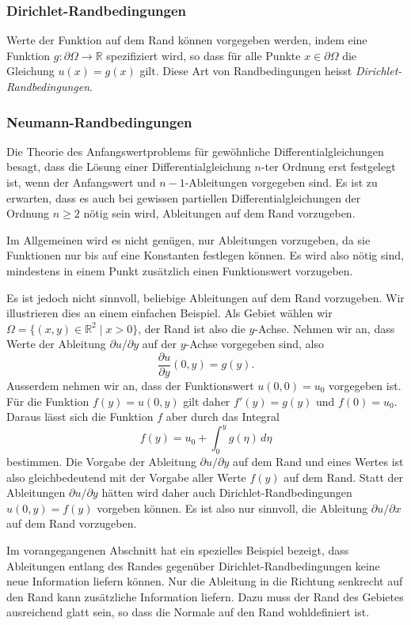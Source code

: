 \subsubsection{Dirichlet-Randbedingungen}
Werte der Funktion auf dem Rand können vorgegeben werden, indem eine
Funktion $g\colon \partial\Omega\to\mathbb R$ spezifiziert wird, so
dass für alle Punkte $x\in\partial\Omega$ die Gleichung
$
u(x) = g(x) 
$
gilt.
Diese Art von Randbedingungen heisst {\em Dirichlet-Randbedingungen}.

\subsubsection{Neumann-Randbedingungen}
Die Theorie des Anfangswertproblems für gewöhnliche Differentialgleichungen
besagt, dass die Lösung einer Differentialgleichung $n$-ter Ordnung erst
festgelegt ist, wenn der Anfangswert und $n-1$-Ableitungen vorgegeben sind.
Es ist zu erwarten, dass es auch bei gewissen partiellen
Differentialgleichungen der Ordnung $n\ge 2$ nötig sein wird, 
Ableitungen auf dem Rand vorzugeben.

Im Allgemeinen wird es nicht genügen, nur Ableitungen vorzugeben,
da sie Funktionen nur bis auf eine Konstanten festlegen können.
Es wird also nötig sind, mindestens in einem Punkt zusätzlich einen
Funktionswert vorzugeben.

Es ist jedoch nicht sinnvoll, beliebige Ableitungen auf dem Rand
vorzugeben.
Wir illustrieren dies an einem einfachen Beispiel.
Als Gebiet wählen wir $\Omega = \{(x,y)\in\mathbb R^2\;|\; x > 0\}$,
der Rand ist also die $y$-Achse.
Nehmen wir an, dass Werte der Ableitung $\partial u/\partial y$ 
auf der $y$-Achse vorgegeben sind, also
\[
\frac{\partial u}{\partial y}(0,y)  = g(y).
\]
Ausserdem nehmen wir an, dass der Funktionswert $u(0,0)=u_0$ vorgegeben ist.
Für die Funktion $f(y) = u(0,y)$ gilt daher $f'(y) = g(y)$ und $f(0)=u_0$.
Daraus lässt sich die Funktion $f$ aber durch das Integral
\[
f(y) = u_0 + \int_0^y g(\eta)\,d\eta
\]
bestimmen.
Die Vorgabe der Ableitung $\partial u/\partial y$ auf dem Rand und eines
Wertes ist also gleichbedeutend mit der Vorgabe aller Werte $f(y)$ auf dem
Rand.
Statt der Ableitungen $\partial u/\partial y$ hätten wird daher auch
Dirichlet-Randbedingungen $u(0,y) = f(y)$ vorgeben können.
Es ist also nur sinnvoll, die Ableitung $\partial u/\partial x$ 
auf dem Rand vorzugeben.

Im vorangegangenen Abschnitt hat ein spezielles Beispiel bezeigt,
dass Ableitungen entlang des Randes gegenüber Dirichlet-Randbedingungen
keine neue Information liefern können.
Nur die Ableitung in die Richtung senkrecht auf den Rand kann zusätzliche
Information liefern.
Dazu muss der Rand des Gebietes ausreichend glatt sein, so dass die
Normale auf den Rand wohldefiniert ist.


